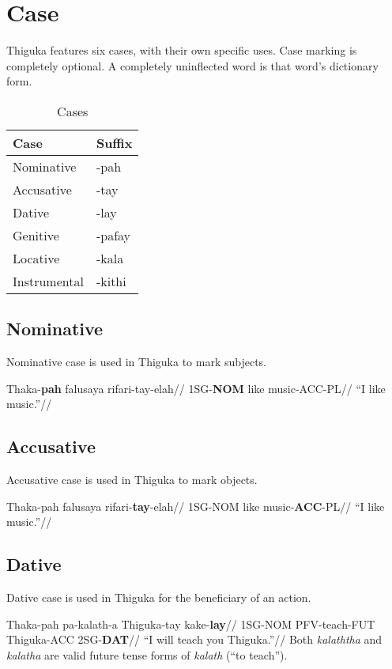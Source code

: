 

\section{Case}
Thiguka features six cases, with their own specific uses.
Case marking is completely optional.
A completely uninflected word is that word's dictionary form.

\begin{table}[h!]
    \centering
    \caption{Cases}
    \begin{tabularx}{8cm}{|X|X|}
        \hline
        \textbf{Case} & \textbf{Suffix} \\
        \hline
        Nominative & -pah \\
        Accusative & -tay \\
        Dative & -lay \\
        Genitive & -pafay \\
        Locative & -kala \\
        Instrumental & -kithi \\ 
        \hline
    \end{tabularx}
\end{table}

\subsection{Nominative}
Nominative case is used in Thiguka to mark subjects.

\ex
\begingl
\gla Thaka-\textbf{pah} falusaya rifari-tay-elah//
\glb 1SG-\textbf{NOM}   like     music-ACC-PL//
\glft ``I like music.''//
\endgl
\xe

\subsection{Accusative}
Accusative case is used in Thiguka to mark objects.

\ex
\begingl
\gla Thaka-pah falusaya rifari-\textbf{tay}-elah//
\glb 1SG-NOM   like     music-\textbf{ACC}-PL//
\glft ``I like music.''//
\endgl
\xe

\subsection{Dative}
Dative case is used in Thiguka for the beneficiary of an action.

\ex
\begingl
\gla Thaka-pah pa-kalath-a   Thiguka-tay kake-\textbf{lay}//
\glb 1SG-NOM   PFV-teach-FUT Thiguka-ACC 2SG-\textbf{DAT}//
\glft``I will teach you Thiguka.''//
\endgl
\xe
Both \textit{kalaththa} and \textit{kalatha} are valid future tense forms of \textit{kalath} (``to teach'').

